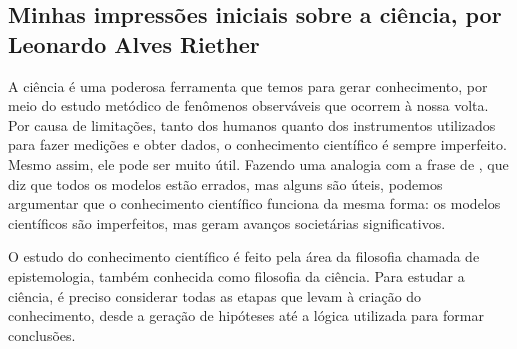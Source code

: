 \subsection{Minhas impressões iniciais sobre a ciência, por Leonardo Alves Riether}

A ciência é uma poderosa ferramenta que temos para gerar conhecimento, por meio do estudo metódico de fenômenos observáveis que ocorrem à nossa volta. Por causa de limitações, tanto dos humanos quanto dos instrumentos utilizados para fazer medições e obter dados, o conhecimento científico é sempre imperfeito. Mesmo assim, ele pode ser muito útil. Fazendo uma analogia com a frase de \citet{box_all_2018}, que diz que todos os modelos estão errados, mas alguns são úteis, podemos argumentar que o conhecimento científico funciona da mesma forma: os modelos científicos são imperfeitos, mas geram avanços societárias significativos.

O estudo do conhecimento científico é feito pela área da filosofia chamada de \gls{epistemologia}, também conhecida como filosofia da ciência. Para estudar a ciência, é preciso considerar todas as etapas que levam à criação do conhecimento, desde a geração de hipóteses até a lógica utilizada para formar conclusões.
